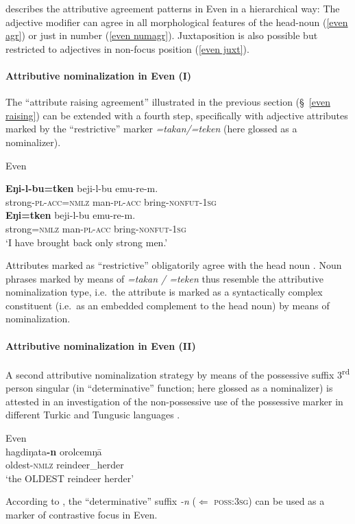 \citet[30–31]{malchukov1995} describes the attributive agreement patterns in Even in a hierarchical way: The adjective modifier can agree in all morphological features of the head-noun (\ref{even agr}) or just in number (\ref{even numagr}). Juxtaposition is also possible but restricted to adjectives in non-focus position (\ref{even juxt}).

\paragraph{Attributive nominalization in Even (I)}
The “attribute raising agreement” illustrated in the previous section (\S~\ref{even raising}) can be extended with a fourth step, specifically with adjective attributes marked by the “restrictive” marker \textit{=takan/=teken} (here glossed as a nominalizer).
\begin{exe}
\ex 
\rm{Even \citep[32]{malchukov1995}}
\begin{xlist}
\ex 
\gll	\textbf{Eŋi-l-bu=tken} beji-l-bu emu-re-m.\\
	strong-\textsc{pl}-\textsc{acc}=\textsc{nmlz} man-\textsc{pl}-\textsc{acc} bring-\textsc{nonfut}-\textsc{1sg}\\
\ex	
\gll	* \textbf{Eŋi=tken} beji-l-bu emu-re-m.\\
	{} strong=\textsc{nmlz} man-\textsc{pl}-\textsc{acc} bring-\textsc{nonfut}-\textsc{1sg}\\
\glt	‘I have brought back only strong men.’
\end{xlist}
\end{exe}
Attributes marked as “restrictive” obligatorily agree with the head noun \cite[32]{malchukov1995}. Noun phrases marked by means of \textit{=takan / =teken} thus resemble the attributive nominalization type, i.e.~the attribute is marked as a syntactically complex constituent (i.e.~as an embedded complement to the head noun) by means of nominalization.

\paragraph{Attributive nominalization in Even (II)}
A second attributive nominalization strategy by means of the possessive suffix 3\textsuperscript{rd} person singular (in “determinative” function; here glossed as a nominalizer) is attested in an investigation of the non-possessive use of the possessive marker in different Turkic and Tungusic languages \citep{benzing1993b}.
\begin{exe}
\ex 
\rm{Even \citep[17–18 Footnote 58]{benzing1993b}}\\
\gll	hagdiŋata\textbf{-n} orolcemŋā\\
	oldest-\textsc{nmlz} reindeer\_herder\\
\glt	‘the OLDEST reindeer herder’
\end{exe}
According to \cite[17–18 Footnote 58]{benzing1993b}, the “determinative” suffix {\it -n} ($\Leftarrow$ \textsc{poss:3sg}) can be used as a marker of contrastive focus in Even.

